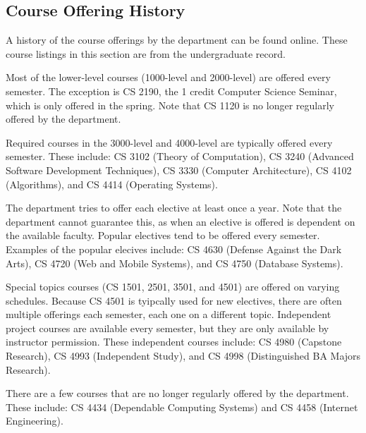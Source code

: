 
\label{sec:coursedesc}


\subsection{Course Offering History}

A history of the course offerings by the department can be found
online.
These course listings in this section are from the undergraduate
record.

Most of the lower-level courses (1000-level and 2000-level) are
offered every semester.  The exception is CS 2190, the 1 credit
Computer Science Seminar, which is only offered in the spring.  Note
that CS 1120 is no longer regularly offered by the department.

Required courses in the 3000-level and 4000-level are typically
offered every semester.  These include: CS 3102 (Theory of
Computation), CS 3240 (Advanced Software Development Techniques), CS
3330 (Computer Architecture), CS 4102 (Algorithms), and CS 4414
(Operating Systems).

The department tries to offer each elective at least once a year.
Note that the department cannot guarantee this, as when an elective is
offered is dependent on the available faculty.  Popular electives tend
to be offered every semester.  Examples of the popular elecives
include: CS 4630 (Defense Against the Dark Arts), CS 4720 (Web and
Mobile Systems), and CS 4750 (Database Systems).

Special topics courses (CS 1501, 2501, 3501, and 4501) are offered on
varying schedules.  Because CS 4501 is tyipcally used for new
electives, there are often multiple offerings each semester, each one
on a different topic.  Independent project courses are available every
semester, but they are only available by instructor permission.  These
independent courses include: CS 4980 (Capstone Research), CS 4993
(Independent Study), and CS 4998 (Distinguished BA Majors Research).

There are a few courses that are no longer regularly offered by the
department.  These include: CS 4434 (Dependable Computing Systems) and
CS 4458 (Internet Engineering).

